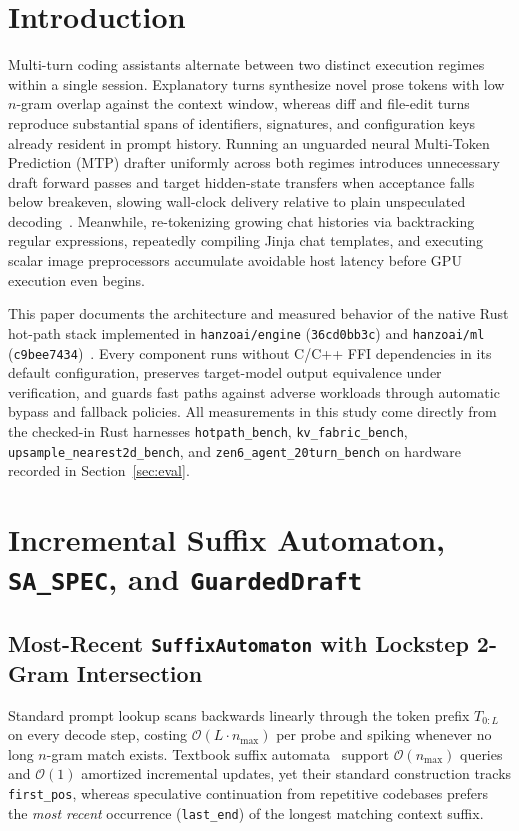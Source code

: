 \documentclass[11pt,a4paper]{article}
\begin{document}
\section{Introduction}
Multi-turn coding assistants alternate between two distinct execution regimes within a single session. Explanatory turns synthesize novel prose tokens with low $n$-gram overlap against the context window, whereas diff and file-edit turns reproduce substantial spans of identifiers, signatures, and configuration keys already resident in prompt history. Running an unguarded neural Multi-Token Prediction (MTP) drafter uniformly across both regimes introduces unnecessary draft forward passes and target hidden-state transfers when acceptance falls below breakeven, slowing wall-clock delivery relative to plain unspeculated decoding~\cite{leviathan2023speculative,chen2023accelerating}. Meanwhile, re-tokenizing growing chat histories via backtracking regular expressions, repeatedly compiling Jinja chat templates, and executing scalar image preprocessors accumulate avoidable host latency before GPU execution even begins.

This paper documents the architecture and measured behavior of the native Rust hot-path stack implemented in \texttt{hanzoai/engine} (\texttt{36cd0bb3c}) and \texttt{hanzoai/ml} (\texttt{c9bee7434})~\cite{hanzo2026engine}. Every component runs without C/C++ FFI dependencies in its default configuration, preserves target-model output equivalence under verification, and guards fast paths against adverse workloads through automatic bypass and fallback policies. All measurements in this study come directly from the checked-in Rust harnesses \texttt{hotpath\_bench}, \texttt{kv\_fabric\_bench}, \texttt{upsample\_nearest2d\_bench}, and \texttt{zen6\_agent\_20turn\_bench} on hardware recorded in Section~\ref{sec:eval}.

\section{Incremental Suffix Automaton, \texttt{SA\_SPEC}, and \texttt{GuardedDraft}}

\subsection{Most-Recent \texttt{SuffixAutomaton} with Lockstep 2-Gram Intersection}
Standard prompt lookup scans backwards linearly through the token prefix $T_{0:L}$ on every decode step, costing $\mathcal{O}(L \cdot n_{\max})$ per probe and spiking whenever no long $n$-gram match exists. Textbook suffix automata~\cite{blumer1985suffix} support $\mathcal{O}(n_{\max})$ queries and $\mathcal{O}(1)$ amortized incremental updates, yet their standard construction tracks \texttt{first\_pos}, whereas speculative continuation from repetitive codebases prefers the \emph{most recent} occurrence (\texttt{last\_end}) of the longest matching context suffix.
\end{document}
